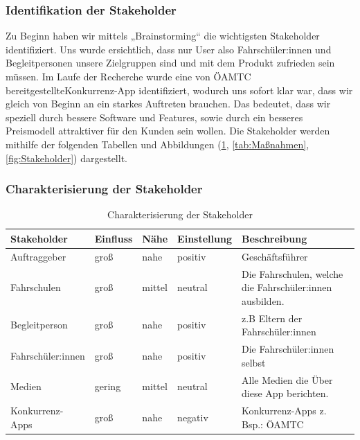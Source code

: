 \subsubsection*{Identifikation der Stakeholder}
Zu Beginn haben wir mittels „Brainstorming“ die wichtigsten Stakeholder identifiziert. Uns wurde ersichtlich, dass nur User also Fahrschüler:innen und Begleitpersonen unsere Zielgruppen sind und mit dem Produkt zufrieden sein müssen. Im Laufe der Recherche wurde eine von ÖAMTC bereitgestellte\hfill\break Konkurrenz-App identifiziert, wodurch uns sofort klar war, dass wir gleich von Beginn an ein starkes Auftreten brauchen. Das bedeutet, dass wir speziell durch bessere Software und Features, sowie durch ein besseres Preismodell attraktiver für den Kunden sein wollen. Die Stakeholder werden mithilfe der folgenden Tabellen und Abbildungen (\cref{tab:Charakterisierung}, \cref{tab:Maßnahmen}, \cref{fig:Stakeholder}) dargestellt.



\subsubsection*{Charakterisierung der Stakeholder}
\begin{table}[H]
	\centering
	\begin{tabularx}{\textwidth}{|l|l|l|l|X|}
		\hline
		\textbf{Stakeholder} & \textbf{Einfluss} & \textbf{Nähe} & \textbf{Einstellung} & \textbf{Beschreibung} \\
		\hline
		Auftraggeber & groß & nahe & positiv & Geschäftsführer \\
		\hline
		Fahrschulen & groß & mittel & neutral & Die Fahrschulen, welche die Fahrschüler:innen ausbilden. \\
		\hline
		Begleitperson & groß & nahe & positiv & z.B Eltern der Fahrschüler:innen \\
		\hline
		Fahrschüler:innen & groß & nahe & positiv & Die Fahrschüler:innen selbst \\
		\hline
		Medien & gering & mittel & neutral & Alle Medien die Über diese App berichten. \\
		\hline
		Konkurrenz-Apps & groß & nahe & negativ & Konkurrenz-Apps z. Bsp.: ÖAMTC \\
		\hline
	\end{tabularx}
	\caption{Charakterisierung der Stakeholder}
	\label{tab:Charakterisierung}

\end{table}

